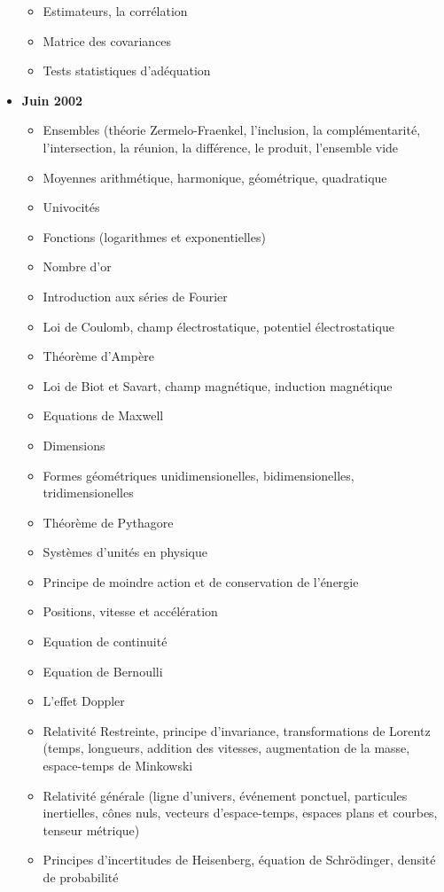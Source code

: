\begin{itemize}
\begin{itemize}[noitemsep]
			\item Estimateurs, la corrélation
			\item Matrice des covariances
			\item Tests statistiques d'adéquation 
		\end{itemize}
		\item \textbf{Juin 2002}
			\begin{itemize}[noitemsep]
				\item Ensembles (théorie Zermelo-Fraenkel, l'inclusion, la complémentarité, l'intersection, la réunion, la différence, le produit, l'ensemble vide
				\item Moyennes arithmétique, harmonique, géométrique, quadratique
				\item Univocités
				\item Fonctions (logarithmes et exponentielles)
				\item Nombre d'or
				\item Introduction aux séries de Fourier
				\item Loi de Coulomb, champ électrostatique, potentiel électrostatique
				\item Théorème d'Ampère
				\item Loi de Biot et Savart, champ magnétique, induction magnétique
				\item Equations de Maxwell
				\item Dimensions
				\item Formes géométriques unidimensionelles, bidimensionelles, tridimensionelles
				\item Théorème de Pythagore
				\item Systèmes d'unités en physique
				\item Principe de moindre action et de conservation de l'énergie
				\item Positions, vitesse et accélération
				\item Equation de continuité
				\item Equation de Bernoulli
				\item L'effet Doppler
				\item Relativité Restreinte, principe d'invariance, transformations de Lorentz (temps, longueurs, addition des vitesses, augmentation de la masse, espace-temps de Minkowski
				\item Relativité générale (ligne d'univers, événement ponctuel, particules inertielles, cônes nuls, vecteurs d'espace-temps, espaces plans et courbes, tenseur métrique)
				\item Principes d'incertitudes de Heisenberg, équation de Schrödinger, densité de probabilité

\end{itemize}
\end{itemize}
